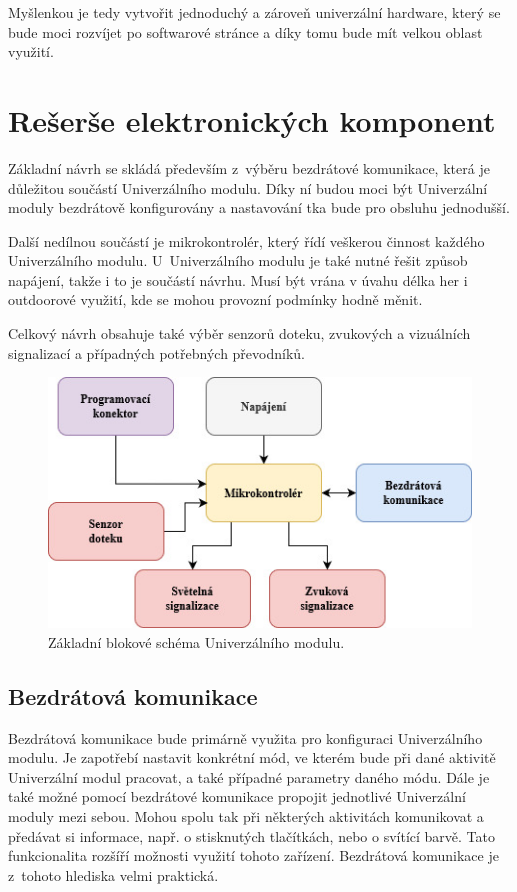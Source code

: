 Myšlenkou je tedy vytvořit jednoduchý a zároveň univerzální hardware, který se bude moci rozvíjet po softwarové stránce a díky tomu bude mít velkou 
oblast využití. 


\chapter{Rešerše elektronických komponent}
Základní návrh se skládá především z~výběru bezdrátové komunikace, která je důležitou součástí Univerzálního modulu. Díky ní budou moci být Univerzální 
moduly bezdrátově konfigurovány a nastavování tka bude pro obsluhu jednodušší. 

Další nedílnou součástí je mikrokontrolér, který řídí veškerou činnost každého Univerzálního modulu. U~Univerzálního modulu je také nutné řešit způsob napájení,
takže i to je součástí návrhu. Musí být vrána v úvahu délka her i outdoorové využití, kde se mohou provozní podmínky hodně měnit. 

Celkový návrh obsahuje také výběr senzorů doteku, zvukových a vizuálních signalizací a případných potřebných převodníků. 

\begin{figure}[!h]
  \begin{center}
    \includegraphics[scale=0.7]{obrazky/zakladni_blokove_schema.jpg}
  \end{center}
  \caption[Základní blokové schéma Univerzálního modulu]{Základní blokové schéma Univerzálního modulu.}
\end{figure}

\section{Bezdrátová komunikace}
Bezdrátová komunikace bude primárně využita pro konfiguraci Univerzálního modulu. Je zapotřebí nastavit konkrétní mód, ve kterém bude při dané 
aktivitě Univerzální modul pracovat, a také případné parametry daného módu. Dále je také možné pomocí bezdrátové komunikace propojit jednotlivé 
Univerzální moduly mezi sebou. Mohou spolu tak při některých aktivitách komunikovat a předávat si informace, např. o stisknutých tlačítkách, nebo 
o svítící barvě. Tato funkcionalita rozšíří možnosti využití tohoto zařízení. Bezdrátová komunikace je z~tohoto hlediska velmi praktická. 

